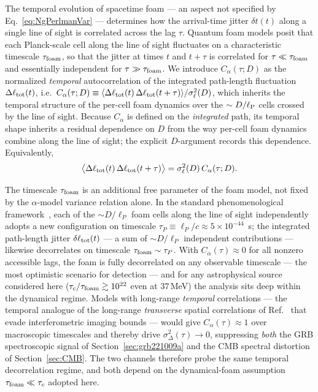 \documentclass[aps,prd,onecolumn,amsmath,amssymb]{revtex4-2}
\begin{document}
The temporal evolution of spacetime foam --- an aspect not specified by
Eq.~\eqref{eq:NgPerlmanVar} --- determines how the arrival-time jitter
$\delta t(t)$ along a single line of sight is correlated across the lag $\tau$.
Quantum foam models posit that each Planck-scale cell along the line of sight
fluctuates on a characteristic timescale $\tau_{\rm foam}$, so that the jitter
at times $t$ and $t+\tau$ is correlated for $\tau \ll \tau_{\rm foam}$ and
essentially independent for $\tau \gg \tau_{\rm foam}$.
We introduce $C_\alpha(\tau;D)$ as the normalized \emph{temporal}
autocorrelation of the integrated path-length fluctuation
$\Delta\ell_{\rm tot}(t)$, i.e.\ $C_\alpha(\tau;D) \equiv
\langle\Delta\ell_{\rm tot}(t)\,\Delta\ell_{\rm tot}(t+\tau)\rangle
/\sigma_\ell^2(D)$, which inherits the temporal structure of the
per-cell foam dynamics over the $\sim D/\ell_{\rm P}$ cells crossed by
the line of sight.
Because $C_\alpha$ is defined on the \emph{integrated} path, its
temporal shape inherits a residual dependence on $D$ from the way
per-cell foam dynamics combine along the line of sight; the explicit
$D$-argument records this dependence.
Equivalently,
\begin{equation}
  \big\langle \Delta\ell_{\rm tot}(t)\,
              \Delta\ell_{\rm tot}(t+\tau) \big\rangle
  = \sigma_\ell^2(D)\,C_\alpha(\tau;D).
  \label{eq:pathcov1ray}
\end{equation}

The timescale $\tau_{\rm foam}$ is an additional free parameter of the
foam model, not fixed by the $\alpha$-model variance relation alone.
In the standard phenomenological framework~\cite{AmelinoCamelia2013,Ng2003},
each of the $\sim D/\ell_P$ foam cells along the line of sight
independently adopts a new configuration on timescale
$\tau_P \equiv \ell_P/c \approx 5\times10^{-44}$~s; the integrated
path-length jitter $\delta\ell_{\rm tot}(t)$ --- a sum of
$\sim D/\ell_P$ independent contributions --- likewise decorrelates on
timescale $\tau_{\rm foam}\sim\tau_P$.  With $C_\alpha(\tau)\approx 0$
for all nonzero accessible lags, the foam is fully decorrelated on any
observable timescale --- the most optimistic scenario for detection ---
and for any astrophysical source considered here
($\tau_c/\tau_{\rm foam}\gtrsim 10^{22}$ even at $37$\,MeV) the
analysis sits deep within the dynamical regime.  Models with long-range
\emph{temporal} correlations --- the temporal analogue of the
long-range \emph{transverse} spatial correlations of
Ref.~\cite{LeeZurekChen2024} that evade interferometric imaging bounds
--- would give $C_\alpha(\tau)\approx 1$ over macroscopic timescales
and thereby drive $\sigma_\Delta^2(\tau)\to 0$, suppressing
\emph{both} the GRB spectroscopic signal of
Section~\ref{sec:grb221009a} and the CMB spectral distortion of
Section~\ref{sec:CMB}.  The two channels therefore probe the same temporal
decorrelation regime, and both depend on the dynamical-foam assumption
$\tau_{\rm foam}\ll\tau_c$ adopted here.
\end{document}
